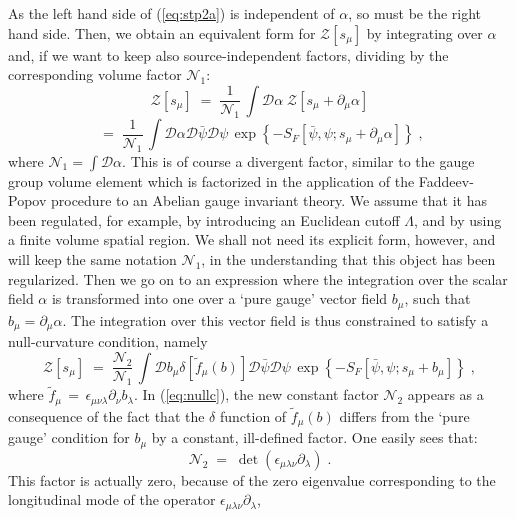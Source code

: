 \documentclass[a4paper,12pt]{article}
\begin{document}
As the left hand side of (\ref{eq:stp2a}) is independent of $\alpha$,
so must be the right hand side. Then, we obtain an equivalent form for
${\mathcal Z}[s_\mu]$ by integrating over $\alpha$ and, if we want to
keep also source-independent factors, dividing by the corresponding
volume factor ${\mathcal N}_1$:
$$
{\mathcal Z}[s_\mu] \;=\;\frac{1}{{\mathcal N}_1}\, \int {\mathcal
  D}\alpha \; {\mathcal Z}[s_\mu + \partial_\mu\alpha]
$$
 \begin{equation}
  \label{eq:stp3}
  \;=\;\frac{1}{{\mathcal N}_1}\, \int {\mathcal
    D}\alpha  {\mathcal D}{\bar\psi} {\mathcal D}\psi \,
    \exp \left\{- S_F[{\bar\psi},\psi; s_\mu + \partial_\mu \alpha] \right\} \;,
\end{equation}
where ${\mathcal N}_1 = \int{\mathcal D}\alpha$. This is of course a divergent
factor, similar to the gauge group volume element which is factorized
in the application of the Faddeev-Popov procedure to an Abelian gauge
invariant theory. We assume that it has been regulated, for example,
by introducing an Euclidean cutoff $\Lambda$, and by using a finite volume
spatial region. We shall not need its explicit form, however, and will
keep the same notation ${\mathcal N}_1$, in the understanding that
this object has been regularized.  Then we go on to an expression
where the integration over the scalar field $\alpha$ is transformed into
one over a `pure gauge' vector field $b_\mu$, such that $b_\mu = \partial_\mu \alpha$.
The integration over this vector field is thus constrained to satisfy
a null-curvature condition, namely
\begin{equation}
  \label{eq:nullc}
  {\mathcal Z}[s_\mu] \;=\;\frac{{\mathcal N}_2}{{\mathcal N}_1}\, \int {\mathcal
    D}b_\mu  \delta[{\tilde f}_\mu(b)]{\mathcal D}{\bar\psi} {\mathcal D}\psi \,
    \exp \left\{- S_F[{\bar\psi},\psi; s_\mu + b_\mu] \right\} \;,
\end{equation}
where ${\tilde f}_\mu\,=\,\epsilon_{\mu\nu\lambda}\partial_\nu b_\lambda$. In (\ref{eq:nullc}), the new
constant factor ${\mathcal N}_2$ appears as a consequence of the fact
that the $\delta$ function of ${\tilde f}_\mu (b)$ differs from the `pure
gauge' condition for $b_\mu$ by a constant, ill-defined factor.  One
easily sees that:
\begin{equation}
  \label{eq:defn2}
  {\mathcal N}_2 \;=\; \det (\epsilon_{\mu\lambda\nu}
  \partial_\lambda) \;.
\end{equation}
This factor is actually zero, because of the zero eigenvalue
corresponding to the longitudinal mode of the operator $\epsilon_{\mu\lambda\nu} \partial_\lambda$,
\end{document}

